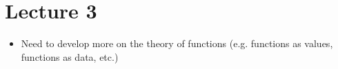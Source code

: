 \section*{Lecture 3}

\begin{itemize}
    \item Need to develop more on the theory of functions (e.g. functions as values, functions as data, etc.)
\end{itemize}